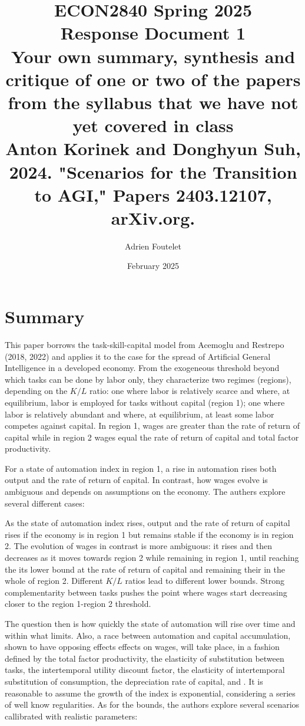 \documentclass{article}
\title{ECON2840 Spring 2025\\Response Document 1\\Your own summary, synthesis and critique of one or two of the papers from the syllabus that we have not yet covered in class\\
Anton Korinek and Donghyun Suh, 2024. "Scenarios for the Transition to AGI," Papers 2403.12107, arXiv.org.
}
\author{Adrien Foutelet}
\date{February 2025}
\begin{document}
\maketitle

\section{Summary}

This paper borrows the task-skill-capital model from Acemoglu and Restrepo (2018, 2022) and applies it to the case for the spread of Artificial General Intelligence in a developed economy. From the exogeneous threshold beyond which tasks can be done by labor only, they characterize two regimes (regions), depending on the \(K/L\) ratio: one where labor is relatively scarce and where, at equilibrium, labor is employed for tasks without capital (region 1); one where labor is relatively abundant and where, at equilibrium, at least some labor competes against capital. In region 1, wages are greater than the rate of return of capital while in region 2 wages equal the rate of return of capital and total factor productivity.

For a state of automation index in region 1, a rise in automation rises both output and the rate of return of capital. In contrast, how wages evolve is ambiguous and depends on assumptions on the economy. The authers explore several different cases:

As the state of automation index rises, output and the rate of return of capital rises if the economy is in region 1 but remains stable if the economy is in region 2. The evolution of wages in contrast is more ambiguous: it rises and then decreases as it moves towards region 2 while remaining in region 1, until reaching the its lower bound at the rate of return of capital and remaining their in the whole of region 2. Different \(K/L\) ratios lead to different lower bounds. Strong complementarity between tasks pushes the point where wages start decreasing closer to the region 1-region 2 threshold.

The question then is how quickly the state of automation will rise over time and within what limits. Also, a race between automation and capital accumulation, shown to have opposing effects effects on wages, will take place, in a fashion defined by the total factor productivity, the elasticity of substitution between tasks, the intertemporal utility discount factor, the elasticity of intertemporal substitution of consumption, the depreciation rate of capital, and . It is reasonable to assume the growth of the index is exponential, considering a series of well know regularities. As for the bounds, the authors explore several scenarios callibrated with realistic parameters:
\end{document}

